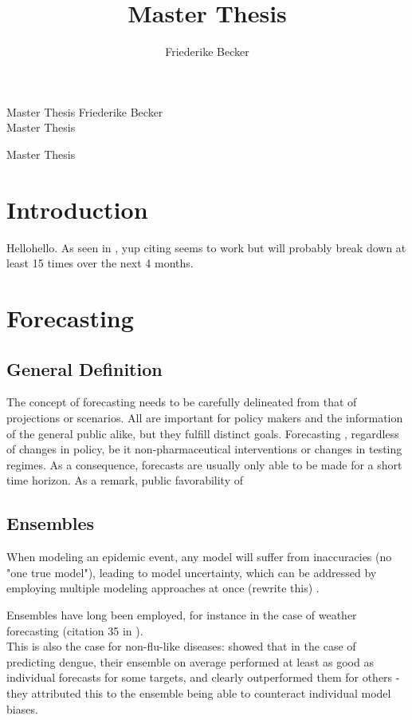 \documentclass[11pt]{article}
\title{Master Thesis}
\author{Friederike Becker}
\begin{document}
\onehalfspacing

\noindent
Master Thesis  \hfill Friederike Becker \\
Master Thesis\\
\begin{center}

\Large{Master Thesis} 
\end{center}

\normalsize
\vspace{2cm}
\section{Introduction}
Hellohello. As seen in \cite{bracher_pre-registered_2021}, yup citing seems to work but will probably break down at least 15 times over the next 4 months. 
\section{Forecasting}
\subsection{General Definition}
The concept of forecasting needs to be carefully delineated from that of projections or scenarios. All are important for policy makers and the information of the general public alike, but they fulfill distinct goals. Forecasting , regardless of changes in policy, be it non-pharmaceutical interventions or changes in testing regimes. As a consequence, forecasts are usually only able to be made for a short time horizon. As a remark, public favorability of 
\subsection{Ensembles}
When modeling an epidemic event, any model will suffer from inaccuracies (no "one true model"), leading to model uncertainty, which can be addressed by employing multiple modeling approaches at once (rewrite this) \cite{zelner_accounting_2021}.

Ensembles have long been employed, for instance in the case of weather forecasting (citation 35 in \cite{yamana_superensemble_2016}).\\
This is also the case for non-flu-like diseases: \cite{yamana_superensemble_2016} showed that in the case of predicting dengue, their ensemble on average performed at least as good as individual forecasts for some targets, and clearly outperformed them for others - they attributed this to the ensemble being able to counteract individual model biases.\\
\end{document}
